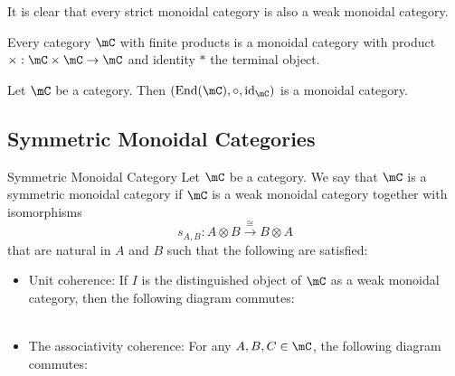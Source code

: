 \documentclass[a4paper]{article}
\begin{document}
It is clear that every strict monoidal category is also a weak monoidal category. 

\begin{lmm}{}{} Every category $\mC$ with finite products is a monoidal category with product $\times:\mC\times\mC\to\mC$ and identity $\ast$ the terminal object. 
\end{lmm}

\begin{prp}{}{} Let $\mC$ be a category. Then $(\text{End}(\mC),\circ,\text{id}_\mC)$ is a monoidal category. 
\end{prp}

\subsection{Symmetric Monoidal Categories}
\begin{defn}{Symmetric Monoidal Category}{} Let $\mC$ be a category. We say that $\mC$ is a symmetric monoidal category if $\mC$ is a weak monoidal category together with isomorphisms $$s_{A,B}:A\otimes B\overset{\cong}{\longrightarrow} B\otimes A$$ that are natural in $A$ and $B$ such that the following are satisfied: 
\begin{itemize}
\item Unit coherence: If $I$ is the distinguished object of $\mC$ as a weak monoidal category, then the following diagram commutes: \\
\\
\item The associativity coherence: For any $A,B,C\in\mC$, the following diagram commutes: \\
\end{itemize}
\end{defn}
\end{document}
